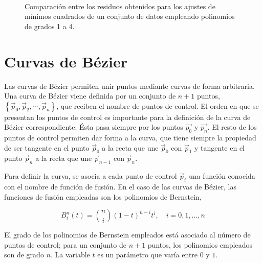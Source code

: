 \begin{figure}[h]
\centering
{} \qquad 
{}\\
 \qquad 
{}
\caption{Comparación entre los residuos obtenidos para los ajustes de mínimos cuadrados de un conjunto de datos empleando polinomios de grados 1 a 4.} 
\label{fig:residuos}
\end{figure}
 
\section{Curvas de Bézier}
Las curvas de Bézier permiten unir puntos mediante curvas de forma arbitraria.  Una curva de Bézier viene definida por un conjunto de $n+1$ puntos, $\left\lbrace\vec{p}_0, \vec{p}_2, \cdots, \vec{p}_n\right\rbrace$, que reciben el nombre de puntos de control. El orden en que se presentan los puntos de control es importante para la definición de la curva de Bézier correspondiente. Ésta pasa siempre por los puntos $\vec{p_0}$ y $\vec{p_n}$. El resto de los puntos de control permiten dar forma a la curva, que tiene siempre la propiedad de ser tangente en el punto $\vec{p}_0$ a la recta que une $\vec{p}_0$ con $\vec{p}_1$ y tangente en el punto $\vec{p}_n$ a la recta que une $\vec{p}_{n-1}$ con $\vec{p}_n$.

Para definir la curva, se asocia a cada punto de control $\vec{p}_i$ una función conocida con el nombre de función de fusión. En el caso de las curvas de Bézier, las funciones de fusión empleadas son los polinomios de Bernstein, 

\begin{equation*}
B_i^n (t)=\binom{n}{i}\left(1-t\right)^{n-i}t^i, \quad i = 0, 1, \dots, n
\end{equation*}

El grado de los polinomios de Bernstein empleados está asociado al número de puntos de control; para un conjunto de $n+1$ puntos, los polinomios empleados son de grado $n$. La variable $t$ es un parámetro que varía entre $0$ y $1$.

